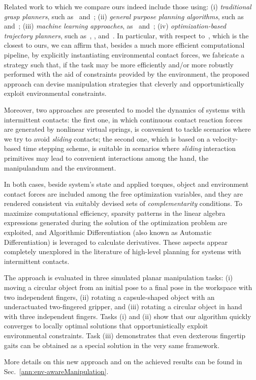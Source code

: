 Related work to which we compare ours indeed include those using: (i) \emph{traditional grasp planners}, such as~\cite{Rosales2013Grasp} and~\cite{Miller:GRASPIT:2004}; (ii) \emph{general purpose planning algorithms}, such as~\cite{Koga:ICRA:1994} and~\cite{Cohen:RSS:2014}; (iii) \emph{machine learning approaches}, as~\cite{Levine:NIPS:2014} and~\cite{Levine:PREPRINT:2014}; (iv) \emph{optimization-based trajectory planners}, such as~\cite{Mordatch:ACMSCA:2012}, \cite{Mordatch:RSS:2014}, and~\cite{Posa:IJRR:2014}. In particular, with respect to~\cite{Posa:IJRR:2014}, which is the closest to ours, we can affirm that, besides a much more efficient computational pipeline, by explicitly instantiating environmental contact forces, we fabricate a strategy such that, if the task may be more efficiently and/or more robustly performed with the aid of constraints provided by the environment, the proposed approach can devise manipulation strategies that cleverly and opportunistically exploit environmental constraints.

Moreover, 
two approaches are presented to model the dynamics of systems with intermittent contacts: the first one, in which continuous contact reaction forces are generated  by nonlinear virtual springs, is convenient to tackle scenarios where we try to avoid \emph{sliding} contacts; the second one, which is based on a velocity-based time stepping scheme, is suitable in scenarios where \emph{sliding} interaction primitives may lead to convenient interactions among the hand, the manipulandum and the environment.

In both cases, beside system's state and applied torques, object and environment contact forces are included among the free optimization variables, and they are rendered consistent via suitably devised sets of \emph{complementarity} conditions. To maximize computational efficiency, sparsity patterns in the linear algebra expressions generated during the solution of the optimization problem are exploited, and Algorithmic Differentiation (also known as Automatic Differentiation) is leveraged to calculate derivatives. These aspects appear completely unexplored in the literature of high-level planning for systems with intermittent contacts.

The approach is evaluated in three simulated planar manipulation tasks: (i) moving a circular object from an initial pose to a final pose in the workspace with two independent fingers, (ii) rotating a capsule-shaped object with an underactuated two-fingered gripper, and (iii) rotating a circular object in hand with three independent fingers. Tasks (i) and (ii) show that our algorithm quickly converges to locally optimal solutions that opportunistically exploit environmental constraints. Task (iii) demonstrates that even dexterous fingertip gaits can be obtained as a special solution in the very same framework.

More details on this new approach and on the achieved results can be found in Sec.~\ref{ann:env-awareManipulation}. %